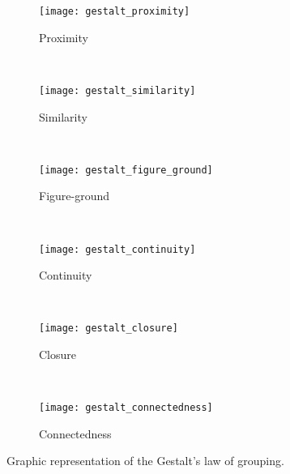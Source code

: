 \begin{figure}[!ht]
    \centering
    \begin{subfigure}[b]{0.25\textwidth}
        \texttt{[image: gestalt\_proximity]}
        \caption{Proximity}
        \label{fig:gestalt_proximity}
    \end{subfigure}
        ~ %
    \begin{subfigure}[b]{0.25\textwidth}
        \texttt{[image: gestalt\_similarity]}
        \caption{Similarity}
        \label{fig:gestalt_similarity}
    \end{subfigure}
        ~ %
    \begin{subfigure}[b]{0.25\textwidth}
        \texttt{[image: gestalt\_figure\_ground]}
        \caption{Figure-ground}
        \label{fig:gestalt_figure_ground}
    \end{subfigure} \\
    \begin{subfigure}[b]{0.25\textwidth}
        \texttt{[image: gestalt\_continuity]}
        \caption{Continuity}
        \label{fig:gestalt_continuity}
    \end{subfigure}
        ~ %
    \begin{subfigure}[b]{0.25\textwidth}
        \texttt{[image: gestalt\_closure]}
        \caption{Closure}
        \label{fig:gestalt_closure}
    \end{subfigure}
        ~ %
    \begin{subfigure}[b]{0.25\textwidth}
        \texttt{[image: gestalt\_connectedness]}
        \caption{Connectedness}
        \label{fig:gestalt_connectedness}
    \end{subfigure}
    
    \caption{Graphic representation of the Gestalt's law of grouping.}\label{fig:gestalt_laws}
\end{figure}

